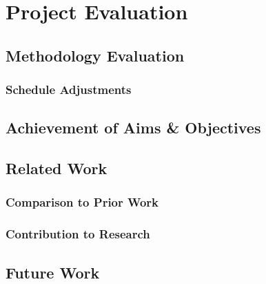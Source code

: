 \chapter{Project Evaluation}

\section{Methodology Evaluation}

\subsection{Schedule Adjustments}

\section{Achievement of Aims \& Objectives}

\section{Related Work}

\subsection{Comparison to Prior Work}

\subsection{Contribution to Research}

\section{Future Work}